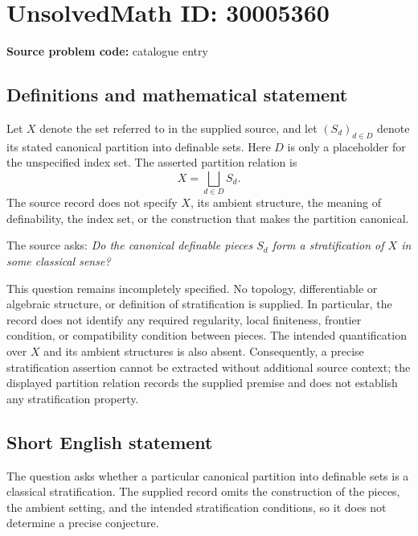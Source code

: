 \documentclass[11pt]{article}
\begin{document}
\section*{UnsolvedMath ID: 30005360}
\textbf{Source problem code:} catalogue entry
\subsection{Definitions and mathematical statement}
Let \(X\) denote the set referred to in the supplied source, and let \((S_d)_{d\in D}\) denote its stated canonical partition into definable sets. Here \(D\) is only a placeholder for the unspecified index set. The asserted partition relation is
\[
X=\bigsqcup_{d\in D}S_d.
\]
The source record does not specify \(X\), its ambient structure, the meaning of definability, the index set, or the construction that makes the partition canonical.

The source asks: \emph{Do the canonical definable pieces \(S_d\) form a stratification of \(X\) in some classical sense?}

This question remains incompletely specified. No topology, differentiable or algebraic structure, or definition of stratification is supplied. In particular, the record does not identify any required regularity, local finiteness, frontier condition, or compatibility condition between pieces. The intended quantification over \(X\) and its ambient structures is also absent. Consequently, a precise stratification assertion cannot be extracted without additional source context; the displayed partition relation records the supplied premise and does not establish any stratification property.
\subsection{Short English statement}
The question asks whether a particular canonical partition into definable sets is a classical stratification. The supplied record omits the construction of the pieces, the ambient setting, and the intended stratification conditions, so it does not determine a precise conjecture.
\end{document}
